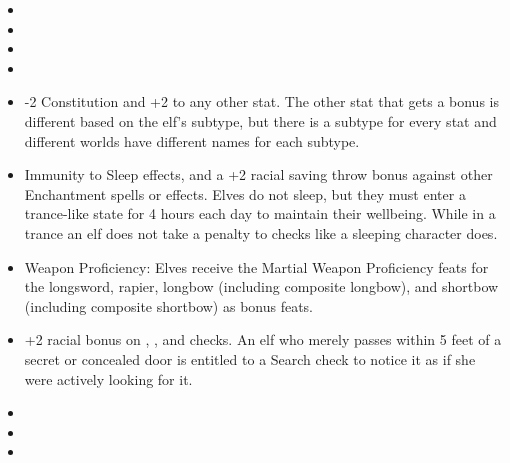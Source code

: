 

\begin{itemize}
\item {}
\item {}
\item {}
\item {}
\item -2 Constitution and +2 to any other stat. The other stat that gets a bonus is different based on the elf's subtype, but there is a subtype for every stat and different worlds have different names for each subtype.
\item Immunity to Sleep effects, and a +2 racial saving throw bonus against other Enchantment spells or effects. Elves do not sleep, but they must enter a trance-like state for 4 hours each day to maintain their wellbeing. While in a trance an elf does not take a penalty to  checks like a sleeping character does.
\item Weapon Proficiency: Elves receive the Martial Weapon Proficiency feats for the longsword, rapier, longbow (including composite longbow), and shortbow (including composite shortbow) as bonus feats.
\item +2 racial bonus on , , and  checks. An elf who merely passes within 5 feet of a secret or concealed door is entitled to a Search check to notice it as if she were actively looking for it.
\item {}
\item {}
\item {}
\end{itemize}
